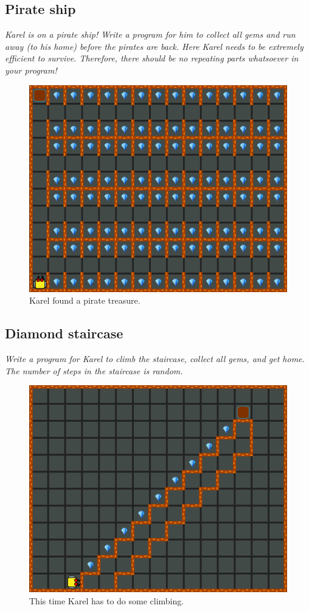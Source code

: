 {{\subsection{Pirate ship}

{\em Karel is on a pirate ship! Write a program for him to collect all 
gems and run away (to his home) before the pirates are back. Here Karel 
needs to be extremely efficient to survive. Therefore, there should be 
no repeating parts whatsoever in your program!}

\begin{figure}[!ht]
\begin{center}
\includegraphics[height=0.4\textwidth]{img/f05.png}
\end{center}
\vspace{-4mm}
\caption{Karel found a pirate treasure.}
\label{fig:f05}
\vspace{-1cm}
\end{figure}
\newpage


\subsection{Diamond staircase}

{\em Write a program for Karel to climb the staircase, collect all gems, and 
get home. The number of steps in the staircase is random. }


\begin{figure}[!ht]
\begin{center}
\includegraphics[height=0.4\textwidth]{img/f06.png}
\end{center}
\vspace{-4mm}
\caption{This time Karel has to do some climbing.}
\label{fig:f06}
\end{figure}



}}
